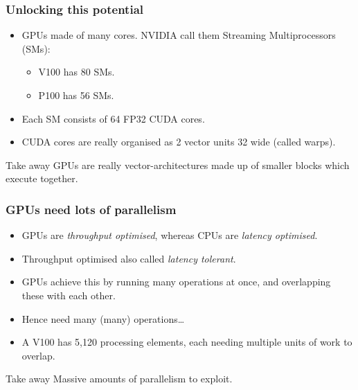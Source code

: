\documentclass{beamer}
\begin{document}
\begin{frame}
\frametitle{Unlocking this potential}
\begin{itemize}
  \item GPUs made of many cores. NVIDIA call them Streaming Multiprocessors (SMs):
    \begin{itemize}
      \item V100 has 80 SMs.
      \item P100 has 56 SMs.
    \end{itemize}
  \item Each SM consists of 64 FP32 CUDA cores.
  \item CUDA cores are really organised as 2 vector units 32 wide (called warps).
\end{itemize}

\begin{block}{Take away}
GPUs are really vector-architectures made up of smaller blocks which execute together.
\end{block}
\end{frame}

\begin{frame}
\frametitle{GPUs need lots of parallelism}
\begin{itemize}
  \item GPUs are \emph{throughput optimised}, whereas CPUs are \emph{latency optimised}.
  \item Throughput optimised also called \emph{latency tolerant}.
  \item GPUs achieve this by running many operations at once, and overlapping these with each other.
  \item Hence need many (many) operations\dots
  \item A V100 has 5,120 processing elements, each needing multiple units of work to overlap.
\end{itemize}
\begin{block}{Take away}
Massive amounts of parallelism to exploit.
\end{block}
\end{frame}

\end{document}
